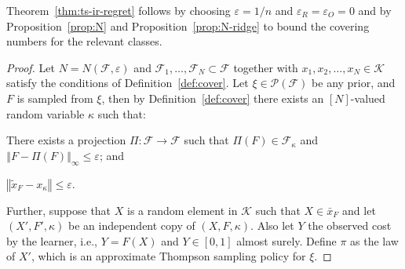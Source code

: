 \documentclass[letter, 12pt]{report}
\newcommand{\epsR}{{\epsilon_R}}
\newcommand{\epsO}{{\epsilon_O}}
\newcommand{\norm}[1]{\left \Vert  #1 \right \Vert}
\newcommand{\cK}{\mathcal K}
\newcommand{\sF}{\mathscr F}
\newcommand{\sP}{\mathscr P}
\newcommand{\1}{\mathbf{1}}
\renewcommand{\epsilon}{\varepsilon}
\theoremstyle{plain}
\theoremstyle{definition}
\theoremstyle{remark}
\begin{document}
Theorem~\ref{thm:ts-ir-regret} follows by choosing $\epsilon = 1/n$ and $\epsR = \epsO = 0$ and by
Proposition~\ref{prop:N} and Proposition~\ref{prop:N-ridge} to bound the covering numbers for the relevant classes.

\begin{proof}
    Let $N = N(\sF, \epsilon)$
    and $\sF_1,\ldots,\sF_N \subset \sF$ together with $x_1, x_2, \ldots, x_N \in \cK$ satisfy the conditions of Definition~\ref{def:cover}.
    Let $\xi \in \sP(\sF)$ be any prior, and $F$ is sampled from $\xi$, then
    by Definition~\ref{def:cover} there exists an $[N]$-valued random variable $\kappa$ such that:
    \begin{enumroman}
        \item There exists a projection $\Pi:\sF \to \sF$ such that
        $\Pi(F) \in \sF_\kappa$ and $\norm{F - \Pi(F)}_\infty \leq \epsilon$; and \label{proof:ir:i}
        \item $\norm{\tilde x_F - x_\kappa} \leq \epsilon$. \label{proof:ir:ii}
    \end{enumroman}
    Further, suppose that $X$ is a random element in $\cK$ such that $X \in \bar x_F$ and let $(X', F', \kappa)$ be an independent copy of $(X, F, \kappa)$.
    Also let $Y$ the observed cost by the learner, i.e., $Y = F(X)$ and
    $Y \in [0,1]$ almost surely.
    Define $\pi$ as the law of $X'$, which is an approximate Thompson sampling policy for $\xi$.


\end{proof}
\end{document}

